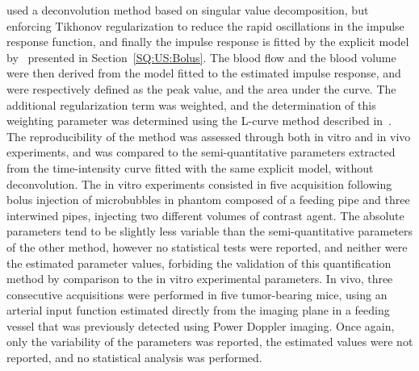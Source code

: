 \citet{Gauthier:2012vc} used a deconvolution method based on singular value decomposition, but enforcing Tikhonov regularization to reduce the rapid oscillations in the impulse response function, and finally the impulse response is fitted by the explicit model by~\citet{Elie2014} presented in Section~\ref{SQ:US:Bolus}.
The blood flow and the blood volume were then derived from the model fitted to the estimated impulse response, and were respectively defined as the peak value, and the area under the curve.
The additional regularization term was weighted, and the determination of this weighting parameter was determined using the L-curve method described in~\cite{Hansen:1992jx}.
The reproducibility of the method was assessed through both in vitro and in vivo experiments, and was compared to the semi-quantitative parameters extracted from the time-intensity curve fitted with the same explicit model, without deconvolution.
The in vitro experiments consisted in five acquisition following bolus injection of microbubbles in phantom composed of a feeding pipe and three interwined pipes, injecting two different volumes of contrast agent.
The absolute parameters tend to be slightly less variable than the semi-quantitative parameters of the other method, however no statistical tests were reported, and neither were the estimated parameter values, forbiding the validation of this quantification method by comparison to the in vitro experimental parameters.
In vivo, three consecutive acquisitions were performed in five tumor-bearing mice, using an arterial input function estimated directly from the imaging plane in a feeding vessel that was previously detected using Power Doppler imaging.
Once again, only the variability of the parameters was reported, the estimated values were not reported, and no statistical analysis was performed.

